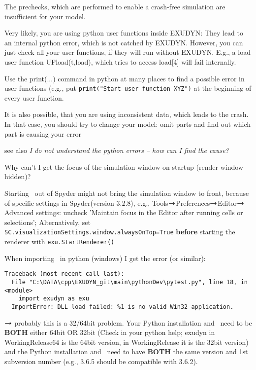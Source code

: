 	\item[$\ra$] The prechecks, which are performed to enable a crash-free simulation are insufficient for your model.
	\item[$\ra$] Very likely, you are using python user functions inside EXUDYN: They lead to an internal python error, which is not catched by EXUDYN. However, you can just check all your user functions, if they will run without EXUDYN. E.g., a load user function UFload(t,load), which tries to access load[4] will fail internally.
	\item[$\ra$] Use the print(...) command in python at many places to find a possible error in user functions (e.g., put \texttt{print("Start user function XYZ")} at the beginning of every user function.
	\item[$\ra$] It is also possible, that you are using inconsistent data, which leads to the crash. In that case, you should try to change your model: omit parts and find out which part is causing your error
	\item[$\ra$] see also {\it I do not understand the python errors -- how can I find the cause?}
 	\ei


  \item Why can't I get the focus of the simulation window on startup (render window hidden)?
	\bi
	\item[$\ra$] Starting \codeName\ out of Spyder might not bring the simulation window to front, because of specific settings in Spyder(version 3.2.8), e.g., Tools$\ra$Preferences$\ra$Editor$\ra$Advanced settings: uncheck 'Maintain focus in the Editor after running cells or selections'; Alternatively, set \texttt{SC.visualizationSettings.window.alwaysOnTop=True} {\bf before} starting the renderer with \texttt{exu.StartRenderer()}
	\ei
  \item When importing \codeName\ in python (windows) I get the error (or similar):\\
{\ttfamily \footnotesize
\begin{lstlisting}[breaklines=true]
Traceback (most recent call last):
  File "C:\DATA\cpp\EXUDYN_git\main\pythonDev\pytest.py", line 18, in <module>
    import exudyn as exu
  ImportError: DLL load failed: %1 is no valid Win32 application.
\end{lstlisting}}
	$\ra$ probably this is a 32/64bit problem. Your Python installation and \codeName\ need to be {\bf BOTH} either 64bit OR 32bit (Check in your python help; exudyn in WorkingRelease64 is the 64bit version, in WorkingRelease it is the 32bit version) and the Python installation and \codeName\ need to have {\bf BOTH} the same version and 1$\mathrm{st}$ subversion number (e.g., 3.6.5 should be compatible with 3.6.2).
\en


